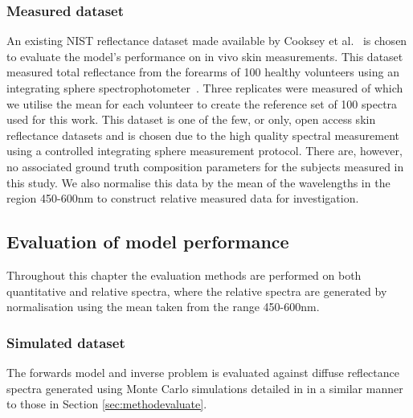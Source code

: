 \subsubsection{Measured dataset}
An existing NIST reflectance dataset made available by Cooksey et al.~\citep{Cooksey2017} is chosen to evaluate the model's performance on in vivo skin measurements. This dataset measured total reflectance from the forearms of 100 healthy volunteers using an integrating sphere spectrophotometer~\citep{Cooksey2017}. Three replicates were measured of which we utilise the mean for each volunteer to create the reference set of 100 spectra used for this work. This dataset is one of the few, or only, open access skin reflectance datasets and is chosen due to the high quality spectral measurement using a controlled integrating sphere measurement protocol. There are, however, no associated ground truth composition parameters for the subjects measured in this study. We also normalise this data by the mean of the wavelengths in the region 450-600nm to construct relative measured data for investigation. 
\FloatBarrier

\subsection{Evaluation of model performance}\label{sec:methodevaluate2}
Throughout this chapter the evaluation methods are performed on both quantitative and relative spectra, where the relative spectra are generated by normalisation using the mean taken from the range 450-600nm.
\subsubsection{Simulated dataset}
The forwards model and inverse problem is evaluated against diffuse reflectance spectra generated using Monte Carlo simulations detailed in  in a similar manner to those in Section \ref{sec:methodevaluate}. 
%

